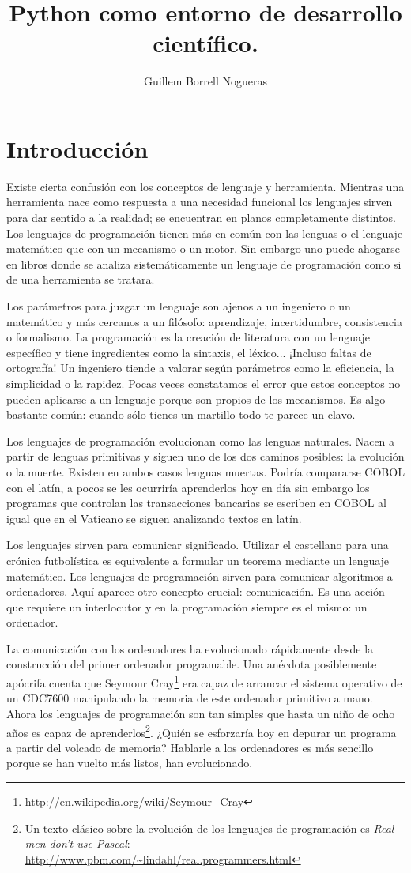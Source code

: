 \documentclass[a4paper,10pt]{article}
\author{Guillem Borrell Nogueras}
\title{Python como entorno de desarrollo científico.}
\begin{document}
\section{Introducción}
Existe cierta confusión con los conceptos de lenguaje y
herramienta. Mientras una herramienta nace como respuesta a una
necesidad funcional los lenguajes sirven para dar sentido a la
realidad; se encuentran en planos completamente distintos. Los
lenguajes de programación tienen más en común con las lenguas o el
lenguaje matemático que con un mecanismo o un motor. Sin embargo uno
puede ahogarse en libros donde se analiza sistemáticamente un lenguaje
de programación como si de una herramienta se tratara.

Los parámetros para juzgar un lenguaje son ajenos a un ingeniero o un
matemático y más cercanos a un filósofo: aprendizaje, incertidumbre,
consistencia o formalismo. La programación es la creación de
literatura con un lenguaje específico y tiene ingredientes como la
sintaxis, el léxico... ¡Incluso faltas de ortografía! Un ingeniero
tiende a valorar según parámetros como la eficiencia, la simplicidad o
la rapidez.  Pocas veces constatamos el error que estos conceptos no
pueden aplicarse a un lenguaje porque son propios de los mecanismos.
Es algo bastante común: cuando sólo tienes un martillo todo te parece
un clavo.

Los lenguajes de programación evolucionan como las lenguas naturales.
Nacen a partir de lenguas primitivas y siguen uno de los dos caminos
posibles: la evolución o la muerte. Existen en ambos casos lenguas
muertas.  Podría compararse COBOL con el latín, a pocos se les
ocurriría aprenderlos hoy en día sin embargo los programas que
controlan las transacciones bancarias se escriben en COBOL al igual
que en el Vaticano se siguen analizando textos en latín.

Los lenguajes sirven para comunicar significado.  Utilizar el
castellano para una crónica futbolística es equivalente a formular un
teorema mediante un lenguaje matemático. Los lenguajes de programación
sirven para comunicar algoritmos a ordenadores. Aquí aparece otro
concepto crucial: comunicación.  Es una acción que requiere un
interlocutor y en la programación siempre es el mismo: un
ordenador. 

La comunicación con los ordenadores ha evolucionado rápidamente desde
la construcción del primer ordenador programable. Una anécdota
posiblemente apócrifa cuenta que Seymour
Cray\footnote{\url{http://en.wikipedia.org/wiki/Seymour_Cray}} era capaz
de arrancar el sistema operativo de un CDC7600 manipulando la memoria
de este ordenador primitivo a mano. Ahora los lenguajes de
programación son tan simples que hasta un niño de ocho años es capaz
de aprenderlos\footnote{Un texto clásico sobre la evolución de los
  lenguajes de programación es \emph{Real men don't use
    Pascal}: \url{http://www.pbm.com/~lindahl/real.programmers.html}}. ¿Quién
se esforzaría hoy en depurar un programa a partir del volcado de
memoria? Hablarle a los ordenadores es más sencillo porque se han
vuelto más listos, han evolucionado.
\end{document}
